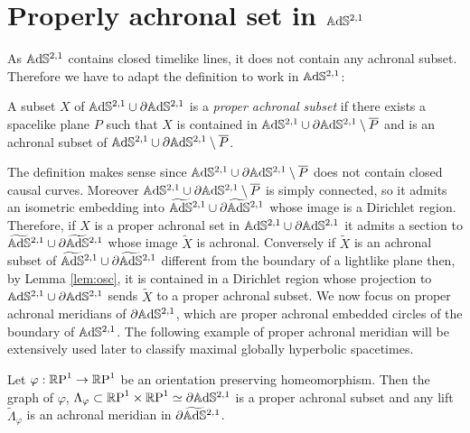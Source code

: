 \section{Properly achronal set in $\A^{2,1}$}
As $\A^{2,1}$ contains closed timelike lines, it does not contain any achronal subset. Therefore we have to adapt the definition to work in $\A^{2,1}$:
\begin{definition}
    A subset $X$ of $\A^{2,1} \cup \partial\A^{2,1}$ is a \textit{proper achronal subset} if there exists a spacelike plane $P$ such that $X$ is contained in $\A^{2,1} \cup \partial\A^{2,1} \setminus \overline{P}$ and is an achronal subset of $\A^{2,1} \cup \partial\A^{2,1} \setminus \overline{P}$.
\end{definition}
The definition makes sense since $\A^{2,1} \cup \partial\A^{2,1} \setminus \overline{P}$ does not contain closed causal curves. Moreover $\A^{2,1} \cup \partial\A^{2,1} \setminus \overline{P}$ is simply connected, so it admits an isometric embedding into $\AS^{2,1} \cup \partial\AS^{2,1}$ whose image is a Dirichlet region. Therefore, if $X$ is a proper achronal set in $\A^{2,1} \cup \partial\A^{2,1}$ it admits a section to $\AS^{2,1} \cup \partial\AS^{2,1}$ whose image $\widetilde{X}$ is achronal. Conversely if $\widetilde{X}$ is an achronal subset of $\AS^{2,1} \cup \partial\AS^{2,1}$ different from the boundary of a lightlike plane then, by Lemma \ref{lem:osc}, it is contained in a Dirichlet region whose projection to $\A^{2,1} \cup \partial\A^{2,1}$ sends $\widetilde{X}$ to a proper achronal subset.
We now focus on proper achronal meridians of $\partial\A^{2,1}$, which are proper achronal embedded circles of the boundary of $\A^{2,1}$. The following example of proper achronal meridian will be extensively used later to classify maximal globally hyperbolic spacetimes.
\begin{lemma}
    Let $\varphi: \S \to \S$ be an orientation preserving homeomorphism. Then the graph of $\varphi$, $\Lambda_\varphi \subset \T \simeq \partial\A^{2,1}$ is a proper achronal subset and any lift $\widetilde{\Lambda}_\varphi$ is an achronal meridian in $\partial\AS^{2,1}$.
\end{lemma}
